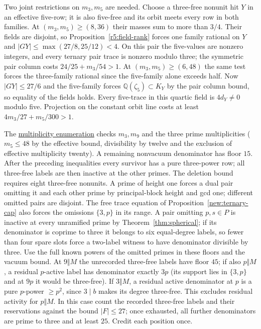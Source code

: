 \documentclass[11pt]{amsart}
\numberwithin{equation}{section}
\theoremstyle{definition}
\theoremstyle{plain}
\newcommand{\QQ}{\mathbb Q}
\newcommand{\supfile}[2]{\href{run:rank-bound-supplement/#1}{#2}}
\begin{document}
Two joint restrictions on $m_3,m_5$ are needed. Choose a three-free
nonunit hit $Y$ in an effective five-row; it is also five-free and its
orbit meets every row in both families. At $(m_3,m_5)\ge(8,36)$ their
masses sum to more than $3/4$. Their fields are disjoint, so
Proposition~\ref{r5:field-rank} forces one family rational on $Y$ and
$|G Y|\le\max(27/8,25/12)<4$. On this pair the five-values are nonzero
integers, and every ternary pair trace is nonzero modulo three; the
symmetric pair column costs $24/25+m_3/54>1$. At $(m_3,m_5)\ge(6,48)$
the same test forces the three-family rational since the five-family
alone exceeds half. Now $|G Y|\le27/6$ and the five-family forces
$\QQ(\zeta_5)\subset K_Y$ by the pair column bound, so equality of the
fields holds. Every five-trace in this quartic field is $4d_Y\ne0$
modulo five. Projection on the constant orbit line costs at least
$4m_3/27+m_5/300>1$.

The \supfile{odd_nonsquare/census.py}{multiplicity enumeration} checks $m_3,m_9$ and the three prime multiplicities
($m_5\le48$ by the effective bound, divisibility by twelve and the
exclusion of effective multiplicity twenty). A remaining nonvacuum
denominator has floor $15$. After the preceding inequalities every
survivor has a pure three-power row; all three-free labels are then
inactive at the other primes. The deletion bound requires eight
three-free nonunits. A prime of height one forces a dual pair omitting
it and each other prime by principal-block height and gcd one;
different omitted pairs are disjoint. The free trace equation of
Proposition~\ref{new:ternary-cap} also forces the omissions $\{3,p\}$ in its
range. A pair omitting $p,s\in P$ is inactive at every unramified
prime by Theorem~\ref{thm:spherical}; if its denominator is coprime to
three it belongs to six equal-degree labels, so fewer than four spare slots force a two-label witness to have denominator divisible by three. Use the full known powers
of the omitted primes in these floors and the vacuum bound. At
$9\Vert M$ the unrecorded three-free labels have floor $45$; if also
$p\Vert M$, a residual $p$-active label has denominator exactly $3p$
(its support lies in $\{3,p\}$ and at $9p$ it would be three-free).
If $3\Vert M$, a residual active denominator at $p$ is a pure
$p$-power $\ge p^2$, since $3\mid b$ makes its degree three-free.
This excludes residual activity for $p\Vert M$. In this case count
the recorded three-free labels and their reservations against the
bound $|F|\le27$; once exhausted, all further denominators are
prime to three and at least $25$. Credit each position once.
\end{document}
